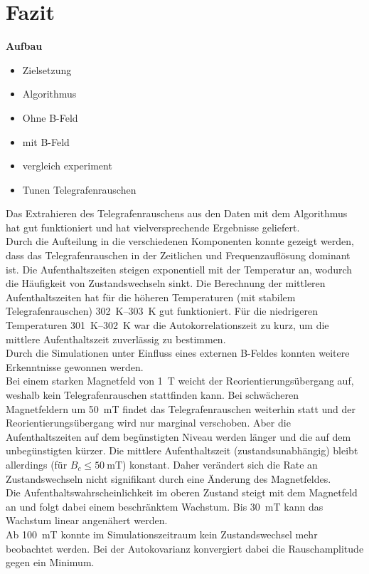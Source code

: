 \documentclass[main.tex]{subfiles}
\begin{document}
\newpage
\section{Fazit}


\textbf{Aufbau}
\begin{itemize}
    \item Zielsetzung
    \item Algorithmus
    \item Ohne B-Feld
    \item mit B-Feld
    \item vergleich experiment
    \item Tunen Telegrafenrauschen
\end{itemize}

Das Extrahieren des Telegrafenrauschens aus den Daten mit dem Algorithmus hat gut funktioniert und hat vielversprechende Ergebnisse geliefert.\\

Durch die Aufteilung in die verschiedenen Komponenten konnte gezeigt werden, dass das Telegrafenrauschen in der Zeitlichen und Frequenzauflösung dominant ist. 
Die Aufenthaltszeiten steigen exponentiell mit der Temperatur an, wodurch die Häufigkeit von Zustandswechseln sinkt. Die Berechnung der mittleren Aufenthaltszeiten hat für die höheren Temperaturen (mit stabilem Telegrafenrauschen) \SIrange{302}{303}{\kelvin} gut funktioniert. Für die niedrigeren Temperaturen \SIrange{301}{302}{\kelvin} war die Autokorrelationszeit zu kurz, um die mittlere Aufenthaltszeit zuverlässig zu bestimmen.\\

Durch die Simulationen unter Einfluss eines externen B-Feldes konnten weitere Erkenntnisse gewonnen werden.\\
Bei einem starken Magnetfeld von \SI{1}{\tesla} weicht der Reorientierungsübergang auf, weshalb kein Telegrafenrauschen stattfinden kann. Bei schwächeren Magnetfeldern um \SI{50}{\milli\tesla} findet das Telegrafenrauschen weiterhin statt und der Reorientierungsübergang wird nur marginal verschoben. Aber die Aufenthaltszeiten auf dem begünstigten Niveau werden länger und die auf dem unbegünstigten kürzer. Die mittlere Aufenthaltszeit (zustandsunabhängig) bleibt allerdings (für \(B_c \leq \SI{50}{\milli\tesla}\)) konstant. Daher verändert sich die Rate an Zustandswechseln nicht signifikant durch eine Änderung des Magnetfeldes.\\
Die Aufenthaltswahrscheinlichkeit im oberen Zustand steigt mit dem Magnetfeld an und folgt dabei einem beschränktem Wachstum. Bis \SI{30}{\milli\tesla} kann das Wachstum linear angenähert werden.\\ 
Ab \SI{100}{\milli\tesla} konnte im Simulationszeitraum kein Zustandswechsel mehr beobachtet werden. Bei der Autokovarianz konvergiert dabei die Rauschamplitude gegen ein Minimum. \\
\end{document}

